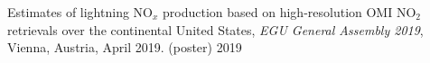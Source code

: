 \begin{cvpresentations}

\publication
{Estimates of lightning NO$_x$ production based on high-resolution OMI NO$_2$ retrievals over the continental United States,
\emph{EGU General Assembly 2019},
Vienna, Austria, April 2019. (poster)} %
{2019} %

\end{cvpresentations}
